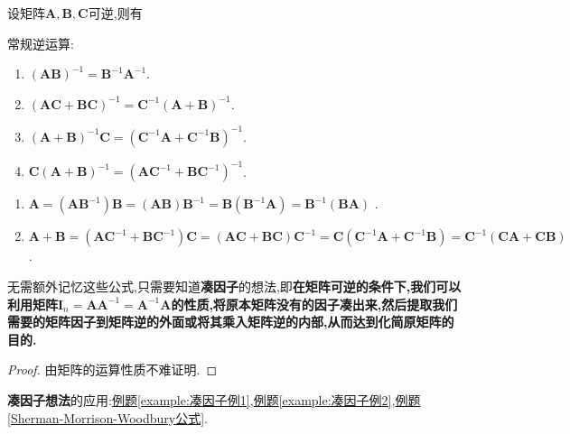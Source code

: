 \documentclass[../../main.tex]{subfiles}%
\begin{document}
\begin{proposition}[矩阵的逆运算]\label{proposition:矩阵的逆运算}
设矩阵$\boldsymbol{A},\boldsymbol{B},\boldsymbol{C}$可逆,则有

常规逆运算:

\begin{enumerate}
\item $\left( \boldsymbol{AB} \right) ^{-1}=\boldsymbol{B}^{-1}\boldsymbol{A}^{-1}$.

\item $\left( \boldsymbol{AC}+\boldsymbol{BC} \right) ^{-1}=\boldsymbol{C}^{-1}\left( \boldsymbol{A}+\boldsymbol{B} \right) ^{-1}$.

\item $\left( \boldsymbol{A}+\boldsymbol{B} \right) ^{-1}\boldsymbol{C}=\left( \boldsymbol{C}^{-1}\boldsymbol{A}+\boldsymbol{C}^{-1}\boldsymbol{B} \right) ^{-1}$.

\item $\boldsymbol{C}\left( \boldsymbol{A}+\boldsymbol{B} \right) ^{-1}=\left( \boldsymbol{AC}^{-1}+\boldsymbol{BC}^{-1} \right) ^{-1}$.
\end{enumerate}
\begin{enumerate}
\item $\boldsymbol{A}=\left( \boldsymbol{AB}^{-1} \right) \boldsymbol{B}=\left( \boldsymbol{AB} \right) \boldsymbol{B}^{-1}=\boldsymbol{B}\left( \boldsymbol{B}^{-1}\boldsymbol{A} \right) =\boldsymbol{B}^{-1}\left( \boldsymbol{BA} \right)$ .

\item $\boldsymbol{A}+\boldsymbol{B}=\left( \boldsymbol{AC}^{-1}+\boldsymbol{BC}^{-1} \right) \boldsymbol{C}=\left( \boldsymbol{AC}+\boldsymbol{BC} \right) \boldsymbol{C}^{-1}=\boldsymbol{C}\left( \boldsymbol{C}^{-1}\boldsymbol{A}+\boldsymbol{C}^{-1}\boldsymbol{B} \right) =\boldsymbol{C}^{-1}\left( \boldsymbol{CA}+\boldsymbol{CB} \right)$ .
\end{enumerate}
\end{proposition}
\begin{note}
无需额外记忆这些公式,只需要知道\textbf{凑因子}的想法,即\textbf{在矩阵可逆的条件下,我们可以利用矩阵$\boldsymbol{I}_n=\boldsymbol{AA}^{-1}=\boldsymbol{A}^{-1}\boldsymbol{A}$的性质,将原本矩阵没有的因子凑出来,然后提取我们需要的矩阵因子到矩阵逆的外面或将其乘入矩阵逆的内部,从而达到化简原矩阵的目的.}
\end{note}
\begin{proof}
由矩阵的运算性质不难证明.
\end{proof}
\begin{remark}
\textbf{凑因子想法}的应用:\hyperref[example:凑因子例1]{例题\ref{example:凑因子例1}},\hyperref[example:凑因子例2]{例题\ref{example:凑因子例2}},\hyperref[Sherman-Morrison-Woodbury公式]{例题\ref{Sherman-Morrison-Woodbury公式}}.
\end{remark}
\end{document}
